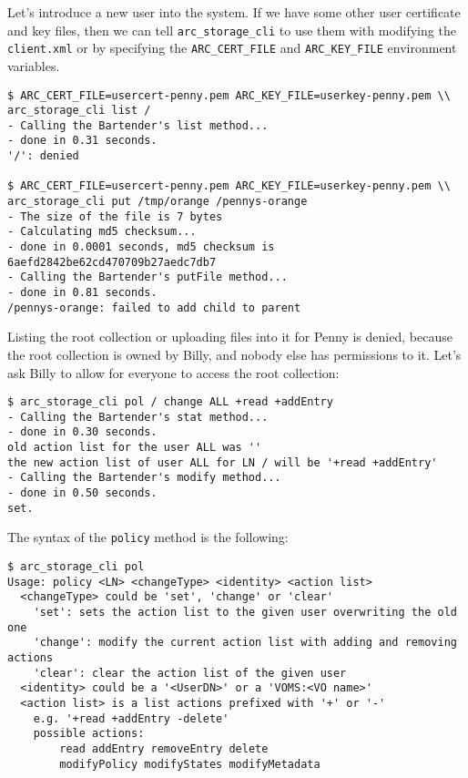 \documentclass{book}
\begin{document}
Let's introduce a new user into the system. If we have some other user certificate and key files, then we can tell \verb!arc_storage_cli! to use them with modifying the \verb!client.xml! or by specifying the \verb!ARC_CERT_FILE! and \verb!ARC_KEY_FILE! environment variables.

\begin{verbatim}
$ ARC_CERT_FILE=usercert-penny.pem ARC_KEY_FILE=userkey-penny.pem \\
arc_storage_cli list /
- Calling the Bartender's list method...
- done in 0.31 seconds.
'/': denied

$ ARC_CERT_FILE=usercert-penny.pem ARC_KEY_FILE=userkey-penny.pem \\
arc_storage_cli put /tmp/orange /pennys-orange
- The size of the file is 7 bytes
- Calculating md5 checksum...
- done in 0.0001 seconds, md5 checksum is 6aefd2842be62cd470709b27aedc7db7
- Calling the Bartender's putFile method...
- done in 0.81 seconds.
/pennys-orange: failed to add child to parent

\end{verbatim}

Listing the root collection or uploading files into it for Penny is denied, because the root collection is owned by Billy, and nobody else has permissions to it. Let's ask Billy to allow for everyone to access the root collection:

\begin{verbatim}
$ arc_storage_cli pol / change ALL +read +addEntry
- Calling the Bartender's stat method...
- done in 0.30 seconds.
old action list for the user ALL was ''
the new action list of user ALL for LN / will be '+read +addEntry'
- Calling the Bartender's modify method...
- done in 0.50 seconds.
set.
\end{verbatim}

The syntax of the \verb!policy! method is the following:

\begin{verbatim}
$ arc_storage_cli pol
Usage: policy <LN> <changeType> <identity> <action list>
  <changeType> could be 'set', 'change' or 'clear'
    'set': sets the action list to the given user overwriting the old one
    'change': modify the current action list with adding and removing actions
    'clear': clear the action list of the given user
  <identity> could be a '<UserDN>' or a 'VOMS:<VO name>'
  <action list> is a list actions prefixed with '+' or '-'
    e.g. '+read +addEntry -delete'
    possible actions:
        read addEntry removeEntry delete
        modifyPolicy modifyStates modifyMetadata
\end{verbatim}
\end{document}
